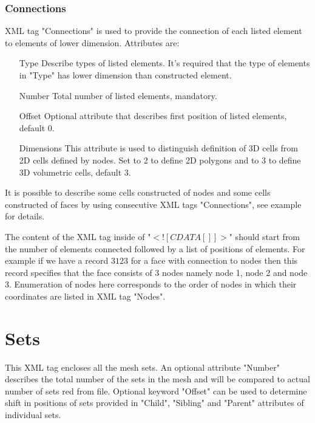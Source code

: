 \documentclass[14pt]{article}
\begin{document}
\subsubsection{Connections}
XML tag "Connections" is used to provide the connection of each listed element to elements of lower dimension. Attributes are:
\begin{itemize}
\item[Type] Describe types of listed elements.  It's required that the type of elements in "Type" has lower dimension than constructed element. 
\item[Number] Total number of listed elements, mandatory. 
\item[Offset] Optional attribute that describes first position of listed elements, default 0.
\item[Dimensions] This attribute is used to distinguish definition of 3D cells from 2D cells defined by nodes. Set to 2 to define 2D polygons and to 3 to define 3D volumetric cells, default 3.
\end{itemize}
It is possible to describe some cells constructed of nodes and some cells constructed of faces by using consecutive XML tags "Connections", see example for details. 

The content of the XML tag inside of "$<![CDATA[]]>$" should start from the number of elements connected followed by a list of positions of elements. For example if we have a record $3 1 2 3$ for a face with connection to nodes then this record specifies that the face consists of 3 nodes namely node 1, node 2 and node 3. Enumeration of nodes here corresponds to the order of nodes in which their coordinates are listed in XML tag "Nodes".
\section{Sets}
This XML tag encloses all the mesh sets. An optional attribute "Number" describes the total number of the sets in the mesh and will be compared to actual number of sets red from file. Optional keyword "Offset" can be used to determine shift in positions of sets provided in "Child", "Sibling" and "Parent" attributes of individual sets.
\end{document}
